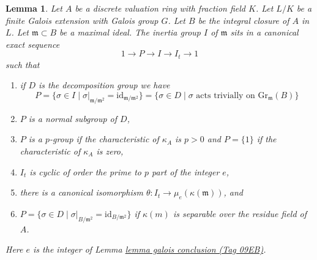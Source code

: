 \documentclass{amsart}
\theoremstyle{plain}
\newtheorem{lemma}[subsection]{Lemma}
\theoremstyle{definition}
\theoremstyle{remark}
\numberwithin{equation}{subsection}
\begin{document}
\begin{lemma}
\label{lemma-galois-inertia}
Let $A$ be a discrete valuation ring with fraction field $K$.
Let $L/K$ be a finite Galois extension with Galois group $G$.
Let $B$ be the integral closure of $A$ in $L$. Let $\mathfrak m \subset B$
be a maximal ideal. The inertia group $I$ of $\mathfrak m$
sits in a canonical exact sequence
$$
1 \to P \to I \to I_t \to 1
$$
such that
\begin{enumerate}
\item if $D$ is the decomposition group we have
$$
P = \{\sigma \in I \mid \sigma|_{\mathfrak m/\mathfrak m^2} =
\text{id}_{\mathfrak m/\mathfrak m^2}\}
=
\{\sigma \in D \mid \sigma \text{ acts trivially on }\text{Gr}_\mathfrak m(B)\}
$$
\item $P$ is a normal subgroup of $D$,
\item $P$ is a $p$-group if the characteristic of $\kappa_A$ is
$p > 0$ and $P = \{1\}$ if the characteristic of $\kappa_A$ is zero,
\item $I_t$ is cyclic of order the prime to $p$ part of the integer $e$,
\item there is a canonical isomorphism
$\theta : I_t \to \mu_e(\kappa(\mathfrak m))$, and
\item
$P =
\{\sigma \in D \mid \sigma|_{B/\mathfrak m^2} = \text{id}_{B/\mathfrak m^2}\}$
if $\kappa(m)$ is separable over the residue field of $A$.
\end{enumerate}
Here $e$ is the integer of Lemma \href{https://stacks.math.columbia.edu/tag/09EB}{lemma galois conclusion (Tag 09EB)}.
\end{lemma}
\end{document}
